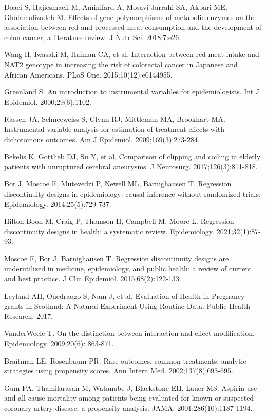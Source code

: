 \begin{references}
\item Doaei S, Hajiesmaeil M, Aminifard A, Mosavi-Jarrahi SA, Akbari ME, Gholamalizadeh M. Effects of gene polymorphisms of metabolic enzymes on the association between red and processed meat consumption and the development of colon cancer; a literature review. J Nutr Sci. 2018;7:e26.
\item Wang H, Iwasaki M, Haiman CA, et al. Interaction between red meat intake and NAT2 genotype in increasing the risk of colorectal cancer in Japanese and African Americans. PLoS One. 2015;10(12):e0144955.
\item Greenland S. An introduction to instrumental variables for epidemiologists. Int J Epidemiol. 2000;29(6):1102.
\item Rassen JA, Schneeweiss S, Glynn RJ, Mittleman MA, Brookhart MA. Instrumental variable analysis for estimation of treatment effects with dichotomous outcomes. Am J Epidemiol. 2009;169(3):273-284.
\item Bekelis K, Gottlieb DJ, Su Y, et al. Comparison of clipping and coiling in elderly patients with unruptured cerebral aneurysms. J Neurosurg. 2017;126(3):811-818.
\item Bor J, Moscoe E, Mutevedzi P, Newell ML, Barnighausen T. Regression discontinuity designs in epidemiology: causal inference without randomized trials. Epidemiology. 2014;25(5):729-737.
\item Hilton Boon M, Craig P, Thomson H, Campbell M, Moore L. Regression discontinuity designs in health: a systematic review. Epidemiology. 2021;32(1):87-93.
\item Moscoe E, Bor J, Barnighausen T. Regression discontinuity designs are underutilized in medicine, epidemiology, and public health: a review of current and best practice. J Clin Epidemiol. 2015;68(2):122-133.
\item Leyland AH, Ouedraogo S, Nam J, et al. Evaluation of Health in Pregnancy grants in Scotland: A Natural Experiment Using Routine Data. Public Health Research; 2017.
\item VanderWeele T. On the distinction between interaction and effect modification. Epidemiology. 2009;20(6): 863-871.
\item Braitman LE, Rosenbaum PR. Rare outcomes, common treatments: analytic strategies using propensity scores. Ann Intern Med. 2002;137(8):693-695.
\item Gum PA, Thamilarasan M, Watanabe J, Blackstone EH, Lauer MS. Aspirin use and all-cause mortality among patients being evaluated for known or suspected coronary artery disease: a propensity analysis. JAMA. 2001;286(10):1187-1194.

\end{references}
